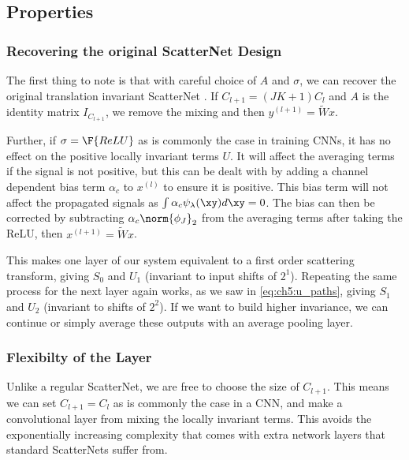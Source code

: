\subsection{Properties}
\subsubsection{Recovering the original ScatterNet Design}
The first thing to note is that with careful choice of $A$ and $\sigma$, we can
recover the original translation invariant ScatterNet
\cite{bruna_invariant_2013, oyallon_scaling_2017}. If $C_{l+1} = (JK+1)C_l$ 
and $A$ is the identity matrix $I_{C_{l+1}}$, we remove the mixing and then $y^{(l+1)} = \tilde{W}x$.

Further, if $\sigma = \F{ReLU}$ as is commonly the case in training CNNs, it has
no effect on the positive locally invariant terms $U$. It will affect the averaging terms
if the signal is not positive, but this can be dealt with by adding a channel
dependent bias term $\alpha_c$ to $x^{(l)}$ to ensure it is positive. This bias term
will not affect the propagated signals as $\int \alpha_c \psi_\lambda(\xy) d\xy =
0$. The bias can then be corrected by subtracting $\alpha_c \norm{\phi_J}_2$ from
the averaging terms after taking the ReLU, then $x^{(l+1)} = \tilde{W}x$.

This makes one layer of our system equivalent to a first order scattering
transform, giving $S_0$ and $U_1$ (invariant to input shifts of $2^1$). Repeating the
same process for the next layer again works, as we saw in \eqref{eq:ch5:u_paths},
giving $S_1$ and $U_2$ (invariant to shifts of $2^2$).  If we want to build
higher invariance, we can continue or simply average these outputs with an average pooling
layer.

\subsubsection{Flexibilty of the Layer}
Unlike a regular ScatterNet, we are free to choose the size of $C_{l+1}$. This
means we can set $C_{l+1} = C_{l}$ as is commonly the case in a CNN, and make a
convolutional layer from mixing the locally invariant terms. This avoids the
exponentially increasing complexity that comes with extra network layers that 
standard ScatterNets suffer from.

